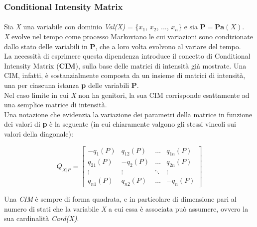   \subsubsection{Conditional Intensity Matrix}
  \paragraph{}
  Sia \textit{X} una variabile con dominio \textit{Val(X)} = \{$x_1$, $x_2$, ..., $x_n$\} e sia
  $\mathbf{P} = \mathbf{Pa}(X)$.\\
  \textit{X} evolve nel tempo come processo Markoviano le cui variazioni sono condizionate dallo
  stato delle variabili in $\mathbf{P}$, che a loro volta evolvono al variare del tempo.\\
  La necessità di esprimere questa dipendenza introduce il concetto di Conditional Intensity Matrix (\textbf{CIM}),
  sulla base delle matrici di intensità già mostrate. Una CIM, infatti, è sostanzialmente composta da un insieme
  di matrici di intensità, una per ciascuna istanza \textbf{p} delle variabili \textbf{P}.\\
  Nel caso limite in cui \textit{X} non ha genitori, la sua CIM corrisponde esattamente ad una semplice
  matrice di intensità.\\
  Una notazione che evidenzia la variazione dei parametri della matrice in funzione dei valori di 
  \textbf{p} è la seguente (in cui chiaramente valgono gli stessi vincoli sui valori della diagonale): 

  \vspace{6mm}
  \[
    Q_{X|P} = 
    \begin{bmatrix}
      -q_1(P) & q_{12}(P) & \dots & q_{1n}(P)\\
      q_{21}(P) & -q_2(P) & \dots & q_{2n}(P)\\
      \vdots & \vdots & \ddots & \vdots\\
      q_{n1}(P) & q_{n2}(P) & \dots & -q_n(P)
    \end{bmatrix} 
  \]
  \vspace{6mm}

  Una \textit{CIM}  è sempre di forma quadrata, e in particolare di dimensione pari al numero di stati
  che la variabile \textit{X} a cui essa è associata può assumere, ovvero la sua cardinalità \textit{Card(X)}.
